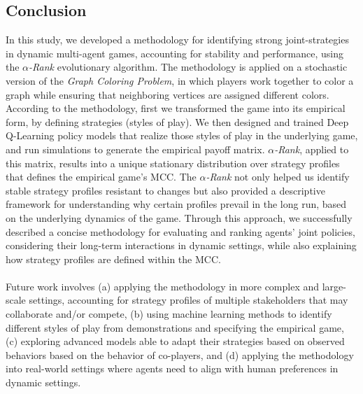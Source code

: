 \subsection{Conclusion}

\begin{flushleft}

    In this study, we developed a methodology for identifying strong joint-strategies in dynamic multi-agent games, accounting for stability and performance, using the \emph{$\alpha$-Rank} evolutionary algorithm. The methodology is applied on a stochastic version of the \emph{Graph Coloring Problem}, in which players work together to color a graph while ensuring that neighboring vertices are assigned different colors. According to the methodology, first we transformed the game into its empirical form, by defining strategies (styles of play). We then designed and trained Deep Q-Learning policy models that realize those styles of play in the underlying game, and run simulations to generate the empirical payoff matrix. \emph{$\alpha$-Rank}, applied to this matrix, results into a unique stationary distribution over strategy profiles that defines the empirical game's MCC. The \emph{$\alpha$-Rank} not only helped us identify stable strategy profiles resistant to changes but also provided a descriptive framework for understanding why certain profiles prevail in the long run, based on the underlying dynamics of the game. Through this approach, we successfully described a concise methodology for evaluating and ranking agents' joint policies, considering their long-term interactions in dynamic settings, while also explaining how strategy profiles are defined within the MCC.\\~\\

    Future work involves (a) applying the methodology in more complex and large-scale settings, accounting for strategy profiles of multiple stakeholders that may collaborate and/or compete, (b) using machine learning methods to identify different styles of play from demonstrations and specifying the empirical game, (c) exploring advanced models able to adapt their strategies based on observed behaviors based on the behavior of co-players, and (d) applying the methodology into real-world settings where agents need to align with human preferences in dynamic settings.

\end{flushleft}